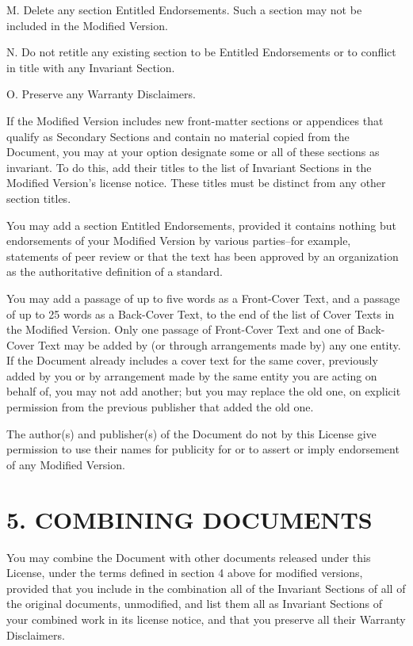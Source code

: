 \documentclass[captions=tableheading]{scrbook}
\begin{document}
M. Delete any section Entitled Endorsements. Such a section may not be included in the Modified Version. 

N. Do not retitle any existing section to be Entitled Endorsements or to conflict in title with any Invariant Section. 

O. Preserve any Warranty Disclaimers.

If the Modified Version includes new front-matter sections or appendices that qualify as Secondary Sections and contain no material copied from the Document, you may at your option designate some or all of these sections as invariant. To do this, add their titles to the list of Invariant Sections in the Modified Version's license notice. These titles must be distinct from any other section titles.

You may add a section Entitled Endorsements, provided it contains nothing but endorsements of your Modified Version by various parties--for example, statements of peer review or that the text has been approved by an organization as the authoritative definition of a standard.

You may add a passage of up to five words as a Front-Cover Text, and a passage of up to 25 words as a Back-Cover Text, to the end of the list of Cover Texts in the Modified Version. Only one passage of Front-Cover Text and one of Back-Cover Text may be added by (or through arrangements made by) any one entity. If the Document already includes a cover text for the same cover, previously added by you or by arrangement made by the same entity you are acting on behalf of, you may not add another; but you may replace the old one, on explicit permission from the previous publisher that added the old one.

The author(s) and publisher(s) of the Document do not by this License give permission to use their names for publicity for or to assert or imply endorsement of any Modified Version.
\section{5. COMBINING DOCUMENTS}
\label{sec-18-6}


You may combine the Document with other documents released under this License, under the terms defined in section 4 above for modified versions, provided that you include in the combination all of the Invariant Sections of all of the original documents, unmodified, and list them all as Invariant Sections of your combined work in its license notice, and that you preserve all their Warranty Disclaimers.
\end{document}
